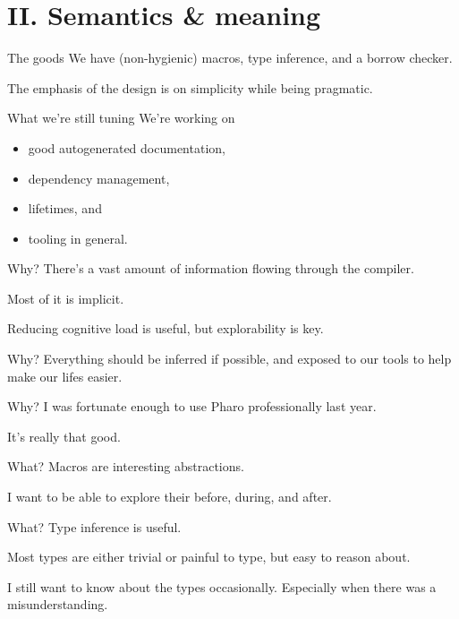 \documentclass[14pt,aspectratio=169]{beamer}
\begin{document}
  \section{II. Semantics \& meaning}
  \begin{frame}{The goods}
    We have (non-hygienic) macros, type inference, and a borrow checker.
    \linebreak

    The emphasis of the design is on simplicity while being pragmatic.
  \end{frame}
  \begin{frame}{What we’re still tuning}
    We’re working on

    \begin{itemize}
      \item good autogenerated documentation,
      \item dependency management,
      \item lifetimes, and
      \item tooling in general.
    \end{itemize}
  \end{frame}
  \begin{frame}{Why?}
    There’s a vast amount of information flowing through the compiler.
    \linebreak

    Most of it is implicit. \linebreak

    Reducing cognitive load is useful, but explorability is key.
  \end{frame}
  \begin{frame}{Why?}
    Everything should be inferred if possible, and exposed to our tools to help
    make our lifes easier.
  \end{frame}
  \begin{frame}{Why?}
    I was fortunate enough to use Pharo professionally last year.
    \linebreak

    It’s really that good.
  \end{frame}
  \begin{frame}{What?}
    Macros are interesting abstractions. \linebreak

    I want to be able to explore their before, during, and after.
  \end{frame}
  \begin{frame}{What?}
    Type inference is useful. \linebreak

    Most types are either trivial or painful to type, but easy to reason about.
    \linebreak

    I still want to know about the types occasionally. Especially when there was
    a misunderstanding.
  \end{frame}
\end{document}
